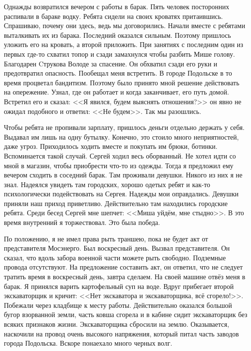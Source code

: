 Однажды возвратился вечером с работы в барак. Пять человек посторонних распивали в бараке водку. Ребята сидели на своих кроватях притаившись. Спрашиваю, почему они здесь, ведь мы договорились. Начали вместе с ребятами выталкивать их из барака. Последний оказался сильным. Поэтому пришлось уложить его на кровать, а второй приложить. При занятиях с последним один из первых где-то схватил топор и сзади замахнулся чтобы разбить Мише голову. Благодарен Cтрукова Володе за спасение. Он обхватил сзади его руки и предотвратил опасность. Пообещал меня встретить. В городе Подольске в то время процветал бандитизм. Поэтому было принято мной решение действовать на опережение. Узнал, где он работает и когда заканчивает, его путь домой. Встретил его и сказал: <<Я явился, будем выяснять отношения?>> он явно не ожидал подобного и ответил: <<Не будем>>. Так мы разошлись.

Чтобы ребята не пропивали зарплату, пришлось деньги отдельно держать у себя. Выдавал им лишь на одну бутылку. Конечно, это стоило много неприятностей, даже угроз. Приходилось ходить вместе и покупать им брюки, ботинки. Вспоминается такой случай. Сергей ходил весь оборванный. Не хотел идти со мной в магазин, чтобы приобрести что-то из одежды. Тогда я предложил ему вечером сходить в соседний барак. Там проживали девушки. Никого из них я не знал. Надеялся увидеть там городских, хорошо одетых ребят и как-то психологически подействовать на Сергея. Надежды мои оправдались. Девушки приняли наш приход приветливо. Действительно там находились городские ребята. Среди бесед Сергей мне шепчет: <<Миша уйдём, мне стыдно>>. В это время внутренний я торжествовал. Это была победа.

По положению, я не имел права рыть траншею, пока не будет акт от представителя Мосэнерго. Был воскресный день. Вызвал представителя. Он сказал, что вдоль забора военной части можете рыть свободно. Подземные провода отсутствуют. На предложение составить акт, он ответил, что не следует тратить время в воскресный день, завтра сделаем. На своей машине отвёз меня в барак. Я принялся варить картофельный суп на воде. Вдруг прибегает второй экскаваторщик и кричит: <<Нет экскаватора и экскаваторщика, всё сгорело!>>. Побежали через кладбище к месту работы. Действительно оказался большой бугор взорванной земли, часть ковша сгорела и в кабине сидит экскаваторщик без всяких признаков жизни. Экскаваторщика сбросили на землю. Оказывается, наскочили на провод очень высокого напряжения, который питал часть заводов города Подольска. Вскоре понаехало много черных волг. 

